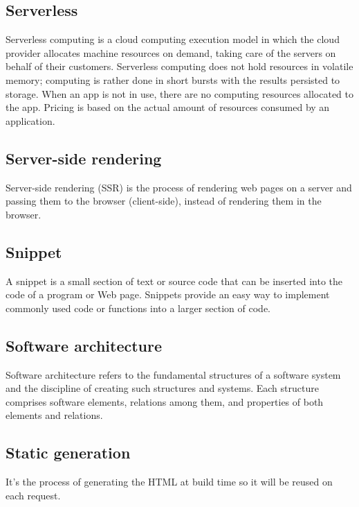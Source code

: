 \subsection*{Serverless}
Serverless computing is a cloud computing execution model in which the cloud provider allocates machine resources on demand,
taking care of the servers on behalf of their customers. Serverless computing does not hold resources in volatile memory;
computing is rather done in short bursts with the results persisted to storage. When an app is not in use,
there are no computing resources allocated to the app. Pricing is based on the actual amount of resources consumed
by an application.
\subsection*{Server-side rendering}
Server-side rendering (SSR) is the process of rendering web pages on a server and passing them to the browser (client-side), instead of rendering them in the browser.
\subsection*{Snippet}
A snippet is a small section of text or source code that can be inserted into the code of a program or Web page. Snippets provide an easy way to implement commonly used code or functions into a larger section of code.
\subsection*{Software architecture}
Software architecture refers to the fundamental structures of a software system and the discipline of creating such structures and systems. Each structure comprises software elements, relations among them, and properties of both elements and relations.
\subsection*{Static generation}
It's the process of generating the HTML at build time so it will be reused on each request.